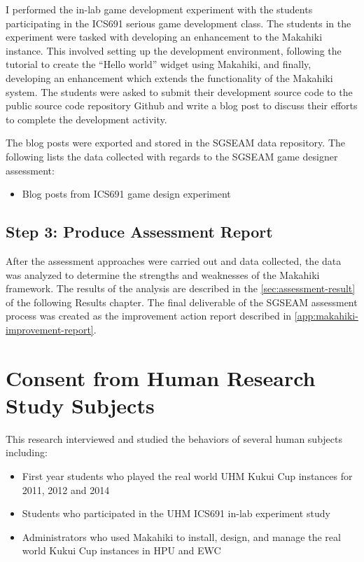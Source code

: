 I performed the in-lab game development experiment with the students participating in the ICS691 serious game development class. The students in the experiment were tasked with developing an enhancement to the Makahiki instance. This involved setting up the development environment, following the tutorial to create the ``Hello world'' widget using Makahiki, and finally, developing an enhancement which extends the functionality of the Makahiki system. 
The students were asked to submit their development source code to the public source code repository Github and write a blog post to discuss their efforts to complete the development activity.

The blog posts were exported and stored in the SGSEAM data repository. The following lists the data collected with regards to the SGSEAM game designer assessment:

\begin{itemize}
\item Blog posts from ICS691 game design experiment
\end{itemize}

\subsection{Step 3: Produce Assessment Report}

After the assessment approaches were carried out and data collected, the data was analyzed to determine the strengths and weaknesses of the Makahiki framework. The results of the analysis are described in the \autoref{sec:assessment-result} of the following Results chapter. The final deliverable of the SGSEAM assessment process was created as the improvement action report described in \autoref{app:makahiki-improvement-report}.

\section{Consent from Human Research Study Subjects}
This research interviewed and studied the behaviors of several human subjects including:

\begin{itemize}
\item First year students who played the real world UHM Kukui Cup instances for 2011, 2012 and 2014
\item Students who participated in the UHM ICS691 in-lab experiment study
\item Administrators who used Makahiki to install, design, and manage the real world Kukui Cup instances in HPU and EWC
\end{itemize}

